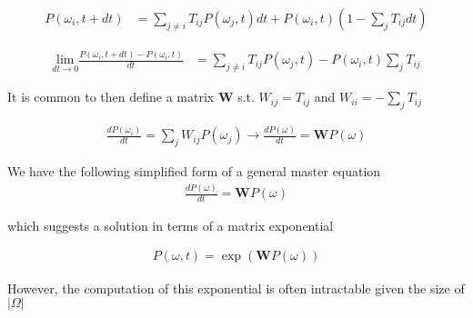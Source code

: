 \documentclass{beamer}					%
\begin{document}
\begin{frame}

\begin{align*}
P(\omega_{i},t+dt) &=  \sum_{j\neq i} T_{ij}P(\omega_{j},t)dt + P(\omega_{i},t)\left(1-\sum_{j}T_{ij}dt\right)
\end{align*}


\begin{align*}
\underset{dt\rightarrow 0}{\mathrm{lim}}\frac{P(\omega_{i},t+dt) - P(\omega_{i},t)}{dt} &=
\sum_{j\neq i} T_{ij}P(\omega_{j},t) - P(\omega_{i},t)\sum_{j}T_{ij}
\end{align*}

It is common to then define a matrix $\mathbf{W}$ s.t. $W_{ij} = T_{ij}$ and $W_{ii} = -\sum_{j}T_{ij}$ 

\begin{align*}
\frac{dP(\omega_{i})}{dt} = \sum_{j}W_{ij}P(\omega_{j}) \rightarrow \frac{dP(\omega)}{dt} = \mathbf{W}P(\omega)
\end{align*}


\end{frame}

\begin{frame}

We have the following simplified form of a general master equation
\begin{align*}
\frac{dP(\omega)}{dt} = \mathbf{W}P(\omega)
\end{align*}

which suggests a solution in terms of a matrix exponential

\begin{align*}
P(\omega,t) = \exp\left(\mathbf{W}P(\omega)\right)
\end{align*}

However, the computation of this exponential is often intractable given the size of $|\Omega|$

\end{frame}
\end{document}
